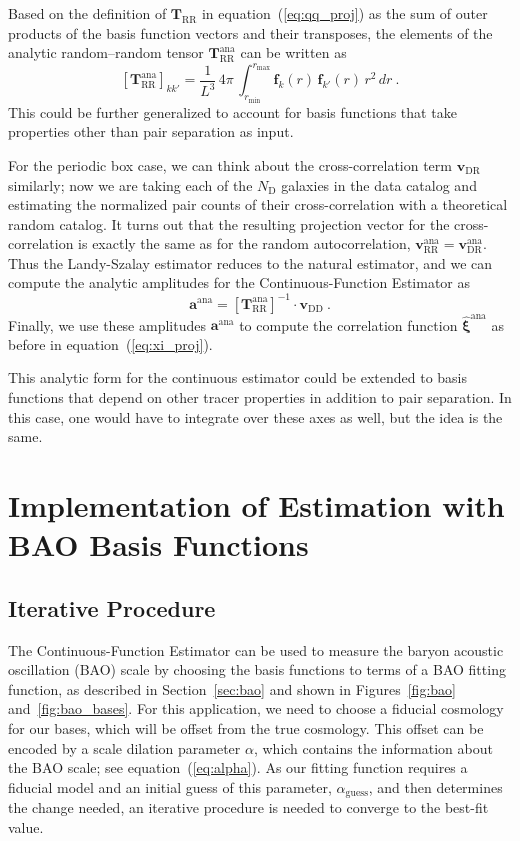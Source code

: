 \documentclass[modern]{aastex62}
\newcommand{\Est}{The Continuous-Function Estimator\xspace}
\newcommand{\est}{the Continuous-Function Estimator\xspace}
\newcommand{\eqt}[1]{equation~(\ref{#1})}
\newcommand{\inv}{^{-1}}
\newcommand{\bld}[1]{\bm{#1}}
\newcommand{\vv}[1]{\bld{v}_\mathrm{#1}}
\newcommand{\TT}[1]{\bld{T}_\mathrm{#1}}
\newcommand{\ff}{\bld{f}}
\newcommand{\NN}[1]{N_\mathrm{#1}}
\begin{document}
Based on the definition of $\TT{RR}$ in \eqt{eq:qq_proj} as the sum of outer products of the basis function vectors and their transposes, the elements of the analytic random--random tensor $\TT{RR}^\mathrm{ana}$ can be written as
\begin{equation}
\left[ \TT{RR}^\mathrm{ana} \right]_{kk'} = \frac{1}{L^3} \, 4\pi \, \int_{r_\mathrm{min}}^{r_\mathrm{max}} \ff_k(r) \, \ff_{k'}(r) \, r^2 \, dr ~.
\end{equation}
This could be further generalized to account for basis functions that take properties other than pair separation as input.

For the periodic box case, we can think about the cross-correlation term $\vv{DR}$ similarly; now we are taking each of the $\NN{D}$ galaxies in the data catalog and estimating the normalized pair counts of their cross-correlation with a theoretical random catalog.
It turns out that the resulting projection vector for the cross-correlation is exactly the same as for the random autocorrelation, $\vv{RR}^\mathrm{ana}  = \vv{DR}^\mathrm{ana}$.
Thus the Landy-Szalay estimator reduces to the natural estimator, and we can compute the analytic amplitudes for \est as
\begin{equation}
\bld{a}^{\mathrm{ana}} = \left[ \TT{RR}^\mathrm{ana} \right]\inv \cdot \vv{DD} ~.
\end{equation}
Finally, we use these amplitudes $\bld{a}^{\mathrm{ana}}$ to compute the correlation function $\bld{\hat{\xi}}^{\mathrm{ana}}$ as before in \eqt{eq:xi_proj}.

This analytic form for the continuous estimator could be extended to basis functions that depend on other tracer properties in addition to pair separation.
In this case, one would have to integrate over these axes as well, but the idea is the same.


\section{Implementation of Estimation with BAO Basis Functions}\label{sec:baoiter}

\subsection{Iterative Procedure}

\Est can be used to measure the baryon acoustic oscillation (BAO) scale by choosing the basis functions to terms of a BAO fitting function, as described in Section~\ref{sec:bao} and shown in Figures~\ref{fig:bao} and~\ref{fig:bao_bases}.
For this application, we need to choose a fiducial cosmology for our bases, which will be offset from the true cosmology.
This offset can be encoded by a scale dilation parameter $\alpha$, which contains the information about the BAO scale; see \eqt{eq:alpha}. 
As our fitting function requires a fiducial model and an initial guess of this parameter, $\alpha_\mathrm{guess}$, and then determines the change needed, an iterative procedure is needed to converge to the best-fit value.
\end{document}
